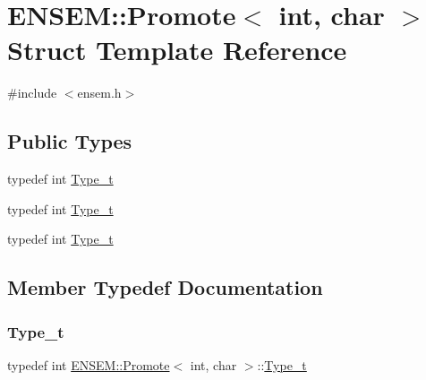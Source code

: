 \hypertarget{structENSEM_1_1Promote_3_01int_00_01char_01_4}{}\section{E\+N\+S\+EM\+:\+:Promote$<$ int, char $>$ Struct Template Reference}
\label{structENSEM_1_1Promote_3_01int_00_01char_01_4}


{\ttfamily \#include $<$ensem.\+h$>$}

\subsection*{Public Types}
\begin{DoxyCompactItemize}
\item 
typedef int \mbox{\hyperlink{structENSEM_1_1Promote_3_01int_00_01char_01_4_ac6a88a37a5f3bfdba13f61e4c901e8e0}{Type\+\_\+t}}
\item 
typedef int \mbox{\hyperlink{structENSEM_1_1Promote_3_01int_00_01char_01_4_ac6a88a37a5f3bfdba13f61e4c901e8e0}{Type\+\_\+t}}
\item 
typedef int \mbox{\hyperlink{structENSEM_1_1Promote_3_01int_00_01char_01_4_ac6a88a37a5f3bfdba13f61e4c901e8e0}{Type\+\_\+t}}
\end{DoxyCompactItemize}


\subsection{Member Typedef Documentation}
\mbox{\label{structENSEM_1_1Promote_3_01int_00_01char_01_4_ac6a88a37a5f3bfdba13f61e4c901e8e0}} 
\subsubsection{\texorpdfstring{Type\_t}{Type\_t}\hspace{0.1cm}{\footnotesize\ttfamily [1/3]}}
{\footnotesize\ttfamily typedef int \mbox{\hyperlink{structENSEM_1_1Promote}{E\+N\+S\+E\+M\+::\+Promote}}$<$ int, char $>$\+::\mbox{\hyperlink{structENSEM_1_1Promote_3_01int_00_01char_01_4_ac6a88a37a5f3bfdba13f61e4c901e8e0}{Type\+\_\+t}}}

\mbox{\label{structENSEM_1_1Promote_3_01int_00_01char_01_4_ac6a88a37a5f3bfdba13f61e4c901e8e0}} 
